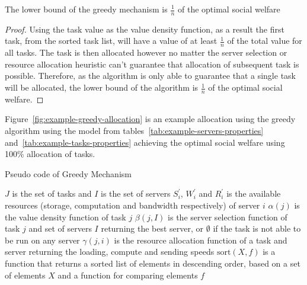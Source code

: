 \begin{theorem}
    The lower bound of the greedy mechanism is $\frac{1}{n}$ of the optimal social welfare
\end{theorem}
\begin{proof}
    Using the task value as the value density function, as a result the first task, from the sorted task list, will
    have a value of at least $\frac{1}{n}$ of the total value for all tasks. The task is then allocated however no
    matter the server selection or resource allocation heuristic can't guarantee that allocation of subsequent task is
    possible. Therefore, as the algorithm is only able to guarantee that a single task will be allocated, the lower
    bound of the algorithm is $\frac{1}{n}$ of the optimal social welfare.
\end{proof}

Figure~\ref{fig:example-greedy-allocation} is an example allocation using the greedy algorithm using the model from
tables~\ref{tab:example-servers-properties} and~\ref{tab:example-tasks-properties} achieving the optimal social
welfare using 100\% allocation of tasks. %

\begin{algorithm}
    \caption{Pseudo code of Greedy Mechanism}
    \label{alg:greedy-mechanism}
    \begin{algorithmic}
        \REQUIRE $J$ is the set of tasks and $I$ is the set of servers
        \REQUIRE $S^{'}_i$, $W^{'}_i$ and $R^{'}_i$ is the available resources (storage, computation and bandwidth respectively) of server $i$
        \REQUIRE $\alpha(j)$ is the value density function of task $j$
        \REQUIRE $\beta(j, I)$ is the server selection function of task $j$ and set of servers $I$ returning the best server, or $\emptyset$ if the task is not able to be run on any server
        \REQUIRE $\gamma(j, i)$ is the resource allocation function of a task and server returning the loading, compute and sending speeds
        \REQUIRE $\text{sort}(X, f)$ is a function that returns a sorted list of elements in descending order, based on a set of elements $X$ and a function for comparing elements $f$

        \ENDIF
        \ENDFOR
    \end{algorithmic}
\end{algorithm}

